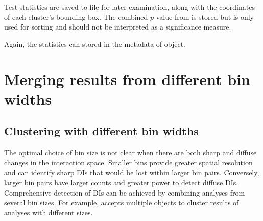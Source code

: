 \documentclass{report}\usepackage[]{graphicx}\usepackage[usenames,dvipsnames]{color}
\newcommand{\hlnum}[1]{\textcolor[rgb]{0.816,0.125,0.439}{#1}}%
\newcommand{\hlstr}[1]{\textcolor[rgb]{0.251,0.627,0.251}{#1}}%
\newcommand{\hlopt}[1]{\textcolor[rgb]{0,0,0}{#1}}%
\newcommand{\hlstd}[1]{\textcolor[rgb]{0.251,0.251,0.251}{#1}}%
\newcommand{\hlkwb}[1]{\textcolor[rgb]{0,0,0}{#1}}%
\newcommand{\hlkwc}[1]{\textcolor[rgb]{0.251,0.251,0.251}{#1}}%
\newcommand{\hlkwd}[1]{\textcolor[rgb]{0.878,0.439,0.125}{#1}}%
\newenvironment{knitrout}{}{} %
\begin{document}
Test statistics are saved to file for later examination, along with the coordinates of each cluster's bounding box.
The combined $p$-value from  is stored but is only used for sorting and should not be interpreted as a significance measure.

\begin{knitrout}
\color{fgcolor}
\end{knitrout}

Again, the statistics can stored in the metadata of  object.

\begin{knitrout}
\color{fgcolor}
\end{knitrout}

\section{Merging results from different bin widths}
\label{sec:mergebins}

\subsection{Clustering with different bin widths}
The optimal choice of bin size is not clear when there are both sharp and diffuse changes in the interaction space.
Smaller bins provide greater spatial resolution and can identify sharp DIs that would be lost within larger bin pairs.
Conversely, larger bin pairs have larger counts and greater power to detect diffuse DIs.
Comprehensive detection of DIs can be achieved by combining analyses from several bin sizes.
For example,  accepts multiple  objects to cluster results of analyses with different sizes.
\end{document}
